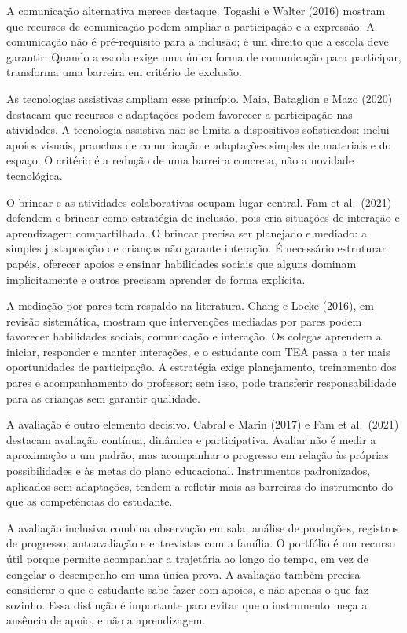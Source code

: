 A comunicação alternativa merece destaque. Togashi e Walter (2016)
mostram que recursos de comunicação podem ampliar a participação e a
expressão. A comunicação não é pré-requisito para a inclusão; é um
direito que a escola deve garantir. Quando a escola exige uma única
forma de comunicação para participar, transforma uma barreira em
critério de exclusão.

As tecnologias assistivas ampliam esse princípio. Maia, Bataglion e Mazo
(2020) destacam que recursos e adaptações podem favorecer a participação
nas atividades. A tecnologia assistiva não se limita a dispositivos
sofisticados: inclui apoios visuais, pranchas de comunicação e
adaptações simples de materiais e do espaço. O critério é a redução de
uma barreira concreta, não a novidade tecnológica.

O brincar e as atividades colaborativas ocupam lugar central. Fam et
al.~(2021) defendem o brincar como estratégia de inclusão, pois cria
situações de interação e aprendizagem compartilhada. O brincar precisa
ser planejado e mediado: a simples justaposição de crianças não garante
interação. É necessário estruturar papéis, oferecer apoios e ensinar
habilidades sociais que alguns dominam implicitamente e outros precisam
aprender de forma explícita.

A mediação por pares tem respaldo na literatura. Chang e Locke (2016),
em revisão sistemática, mostram que intervenções mediadas por pares
podem favorecer habilidades sociais, comunicação e interação. Os colegas
aprendem a iniciar, responder e manter interações, e o estudante com TEA
passa a ter mais oportunidades de participação. A estratégia exige
planejamento, treinamento dos pares e acompanhamento do professor; sem
isso, pode transferir responsabilidade para as crianças sem garantir
qualidade.

A avaliação é outro elemento decisivo. Cabral e Marin (2017) e Fam et
al.~(2021) destacam avaliação contínua, dinâmica e participativa.
Avaliar não é medir a aproximação a um padrão, mas acompanhar o
progresso em relação às próprias possibilidades e às metas do plano
educacional. Instrumentos padronizados, aplicados sem adaptações, tendem
a refletir mais as barreiras do instrumento do que as competências do
estudante.

A avaliação inclusiva combina observação em sala, análise de produções,
registros de progresso, autoavaliação e entrevistas com a família. O
portfólio é um recurso útil porque permite acompanhar a trajetória ao
longo do tempo, em vez de congelar o desempenho em uma única prova. A
avaliação também precisa considerar o que o estudante sabe fazer com
apoios, e não apenas o que faz sozinho. Essa distinção é importante para
evitar que o instrumento meça a ausência de apoio, e não a aprendizagem.

